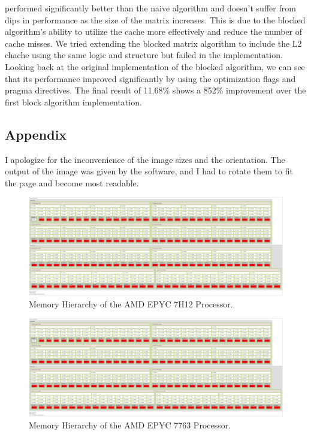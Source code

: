 \documentclass[unicode,11pt,a4paper,oneside,numbers=endperiod,openany]{scrartcl}
\begin{document}
performed significantly better than the naive algorithm and doesn't suffer from dips in performance as the size of the 
matrix increases. This is due to the blocked algorithm's ability to utilize the cache more effectively and reduce the
number of cache misses. We tried extending the blocked matrix algorithm to include the L2 chache using the same 
logic and structure but failed in the implementation.
Looking back at the original implementation of the blocked algorithm, we can see that its performance improved significantly
by using the optimization flags and pragma directives. The final result of 11.68\% shows a 852\% improvement over the first
block algorithm implementation.





\subsection*{Appendix}
I apologize for the inconvenience of the image sizes and the orientation. The output of the image
was given by the software, and I had to rotate them to fit the page and become most readable.

\begin{figure}[htbp]
    \centering
    \includegraphics[width=1.5\textwidth, angle=90]{../cache_main_mem/eulerVII_I/EPYC_7H12.pdf}
    \caption{Memory Hierarchy of the AMD EPYC 7H12 Processor.}
\label{fig:7H12_processor}
\end{figure}


\begin{figure}[htbp]
    \centering
    \includegraphics[width=1.5\textwidth, angle=90]{../cache_main_mem/EulerVII_II/EPYC_7763.pdf}
    \caption{Memory Hierarchy of the AMD EPYC 7763 Processor.}
\label{fig:7763_processor}
\end{figure}
\end{document}
